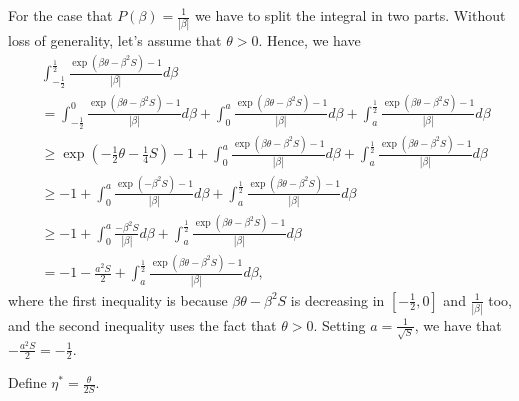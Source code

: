 \documentclass{colt2016_empty} %
\begin{document}
For the case that $P(\beta)=\frac{1}{|\beta|}$ we have to split the integral in two parts.
Without loss of generality, let's assume that $\theta>0$. Hence, we have
\begin{align*}
&\int_{-\frac{1}{2}}^{\frac{1}{2}} \frac{\exp\left(\beta \theta - \beta^2 S \right)-1}{|\beta|}  d \beta \\ 
&=\int_{-\frac{1}{2}}^{0} \frac{\exp\left(\beta \theta - \beta^2 S \right)-1}{|\beta|} d \beta
+ \int_{0}^{a} \frac{\exp\left(\beta \theta - \beta^2 S \right)-1}{|\beta|} d \beta
+\int_{a}^{\frac{1}{2}} \frac{\exp\left(\beta \theta - \beta^2 S \right)-1}{|\beta|} d \beta \\
&\geq \exp\left(-\frac{1}{2} \theta - \frac{1}{4} S \right)-1 
+ \int_{0}^{a} \frac{\exp\left(\beta \theta - \beta^2 S \right)-1}{|\beta|} d \beta
+\int_{a}^{\frac{1}{2}} \frac{\exp\left(\beta \theta - \beta^2 S \right)-1}{|\beta|} d \beta \\
&\geq -1 + \int_{0}^{a} \frac{\exp\left(- \beta^2 S \right)-1}{|\beta|} d \beta
+\int_{a}^{\frac{1}{2}} \frac{\exp\left(\beta \theta - \beta^2 S \right)-1}{|\beta|} d \beta \\
&\geq -1 + \int_{0}^{a} \frac{- \beta^2 S}{|\beta|} d \beta
+\int_{a}^{\frac{1}{2}} \frac{\exp\left(\beta \theta - \beta^2 S \right)-1}{|\beta|} d \beta \\
&= -1  -\frac{a^2 S}{2}
+\int_{a}^{\frac{1}{2}} \frac{\exp\left(\beta \theta - \beta^2 S \right)-1}{|\beta|} d \beta,
\end{align*}
where the first inequality is because $\beta \theta - \beta^2 S$ is decreasing in $[-\tfrac{1}{2},0]$ and $\tfrac{1}{|\beta|}$ too, and the second inequality uses the fact that $\theta>0$.
Setting $a=\tfrac{1}{\sqrt{S}}$, we have that $-\frac{a^2 S}{2} = -\frac{1}{2}$.

Define $\eta^*=\frac{\theta}{2 S}$.
\end{document}
